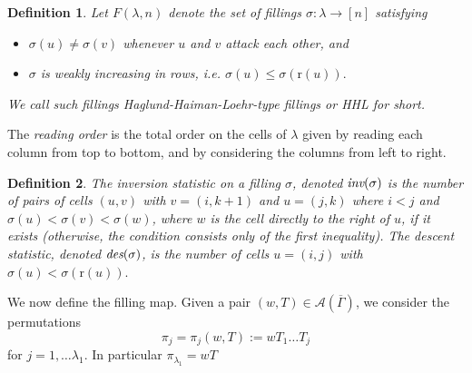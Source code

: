 \documentclass[11pt]{amsart}
\newtheorem{definition}{Definition}[section]
\begin{document}
{\begin{definition}\label{lst:1}
Let $F(\lambda, n)$ denote the set of fillings $\sigma: \lambda \rightarrow [n]$ satisfying
\begin{itemize}
\item $\sigma(u) \neq \sigma(v)$ whenever $u$ and $v$ attack each other, and
\item $\sigma$ is weakly increasing in rows, i.e. $\sigma(u) \leq \sigma(\textrm{r}(u)).$
\end{itemize}
We call such fillings \emph{Haglund-Haiman-Loehr-type fillings} or \emph{HHL} for short. 
\end{definition}

\indent The \emph{reading order} is the total order on the cells of $\lambda$ given by reading each column from top to bottom, and by considering the columns from left to right.
\begin{definition}
The \emph{inversion statistic} on a filling $\sigma$, denoted $\emph{inv}(\sigma)$ is the number of pairs of cells $(u,v)$ with $v=(i,k+1)$ and $u=(j,k)$ where $i<j$ and  $\sigma(u)<\sigma(v)<\sigma(w)$, where $w$ is the cell directly to the right of $u$, if it exists (otherwise, the condition consists only of the first inequality). The \textrm{descent statistic}, denoted $\emph{des}(\sigma)$, is the number of cells $u=(i,j)$ with $\sigma(u) < \sigma (\textrm{r}(u)).$
\end{definition}



We now define the filling map. Given a pair $(w,T)\in \mathcal{A}(\overline{\Gamma})$, we consider the permutations $$ \pi_{j}=\pi_{j}(w,T):=wT_{1}\ldots T_{j}$$ for $j=1,\ldots \lambda_{1}$. In particular $\pi_{\lambda_{1}}=wT$

}
\end{document}

